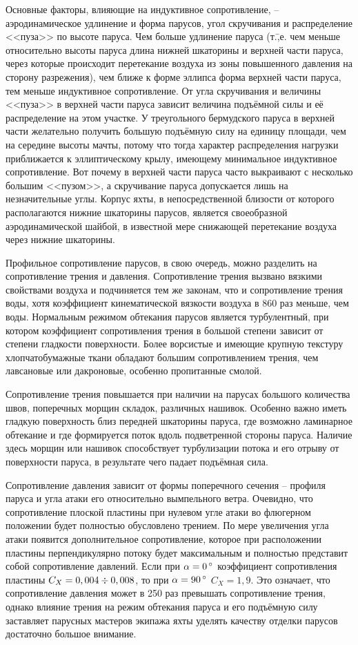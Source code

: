 Основные факторы, влияющие на индуктивное сопротивление, \---
аэродинамическое удлинение и форма парусов, угол скручивания и
распределение <<пуза>> по высоте паруса. Чем больше удлинение паруса
(т.\=,е. чем меньше относительно высоты паруса длина нижней шкаторины
и верхней части паруса, через которые происходит перетекание воздуха
из зоны повышенного давления на сторону разрежения), чем ближе к форме
эллипса форма верхней части паруса, тем меньше индуктивное
сопротивление. От угла скручивания и величины <<пуза>> в верхней части
паруса зависит величина подъёмной силы и её распределение на этом
участке. У треугольного бермудского паруса в верхней части желательно
получить большую подъёмную силу на единицу площади, чем на середине
высоты мачты, потому что тогда характер распределения нагрузки
приближается к эллиптическому крылу, имеющему минимальное индуктивное
сопротивление. Вот почему в верхней части паруса часто выкраивают с
несколько большим <<пузом>>, а скручивание паруса допускается лишь на
незначительные углы. Корпус яхты, в непосредственной близости от
которого располагаются нижние шкаторины парусов, является своеобразной
аэродинамической шайбой, в известной мере снижающей перетекание
воздуха через нижние шкаторины.

Профильное сопротивление парусов, в свою очередь, можно разделить на
сопротивление трения и давления. Сопротивление трения вызвано вязкими
свойствами воздуха и подчиняется тем же законам, что и сопротивление
трения воды, хотя коэффициент кинематической вязкости воздуха в 860
раз меньше, чем воды. Нормальным режимом обтекания парусов является
турбулентный, при котором коэффициент сопротивления трения в большой
степени зависит от степени гладкости поверхности. Более ворсистые и
имеющие крупную текстуру хлопчатобумажные ткани обладают большим
сопротивлением трения, чем лавсановые или дакроновые, особенно
пропитанные смолой.

Сопротивление трения повышается при наличии на парусах большого
количества швов, поперечных морщин складок, различных
нашивок. Особенно важно иметь гладкую поверхность близ передней
шкаторины паруса, где возможно ламинарное обтекание и где формируется
поток вдоль подветренной стороны паруса. Наличие здесь морщин или
нашивок способствует турбулизации потока и его отрыву от поверхности
паруса, в результате чего падает подъёмная сила.

Сопротивление давления зависит от формы поперечного сечения \---
профиля паруса и угла атаки его относительно вымпельного
ветра. Очевидно, что сопротивление плоской пластины при нулевом угле
атаки во флюгерном положении будет полностью обусловлено трением. По
мере увеличения угла атаки появится дополнительное сопротивление,
которое при расположении пластины перпендикулярно потоку будет
максимальным и полностью представит собой сопротивление давлений. Если
при $\alpha = 0\,^\circ$ коэффициент сопротивления пластины
$C_X = 0,004\div 0,008$, то при $\alpha = 90\,^\circ$ $C_X = 1,9$. Это
означает, что сопротивление давления может в 250 раз
превышать сопротивление трения, однако влияние трения на режим
обтекания паруса и его подъёмную силу заставляет парусных мастеров
экипажа яхты уделять качеству отделки парусов достаточно большое
внимание.

